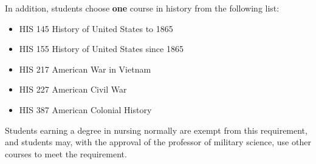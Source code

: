 \documentclass[
  letterpaper,
]{scrbook}
\providecommand{\tightlist}{%
  \setlength{\itemsep}{0pt}\setlength{\parskip}{0pt}}
\begin{document}
In addition, students choose \textbf{one} course in history from the
following list:

\begin{itemize}
\tightlist
\item
  HIS 145 History of United States to 1865\\
\item
  HIS 155 History of United States since 1865\\
\item
  HIS 217 American War in Vietnam\\
\item
  HIS 227 American Civil War\\
\item
  HIS 387 American Colonial History
\end{itemize}

Students earning a degree in nursing normally are exempt from this
requirement, and students may, with the approval of the professor of
military science, use other courses to meet the requirement.
\end{document}

